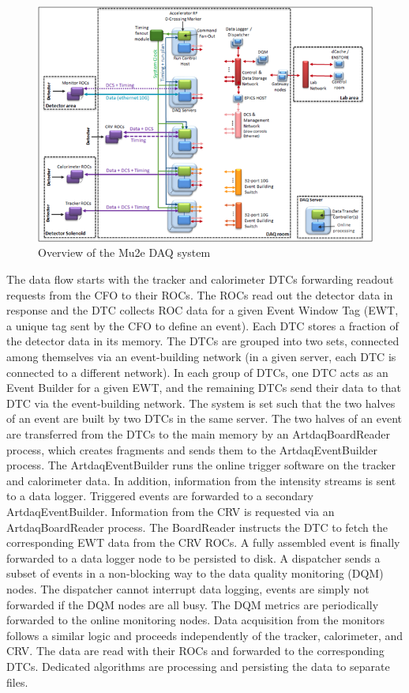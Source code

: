 \begin{figure}[htb]
\begin{center}
\includegraphics[width=0.9\linewidth]{figures/daq-overview.png}
\caption{Overview of the Mu2e DAQ system}
\label{fig:daqoverview}
\end{center}
\end{figure}

The data flow starts with the tracker and calorimeter DTCs forwarding readout requests from the CFO to their ROCs. The ROCs read out the detector data in response and the DTC collects ROC data for a given Event Window Tag (EWT, a unique tag sent by the CFO to define an event). Each DTC stores a fraction of the detector data in its memory. The DTCs are grouped into two sets, connected among themselves via an event-building network (in a given server, each DTC is connected to a different network). In each group of DTCs, one DTC acts as an Event Builder for a given EWT, and the remaining DTCs send their data to that DTC via the event-building network. The system is set such that the two halves of an event are built by two DTCs in the same server. The two halves of an event are transferred from the DTCs to the main memory by an ArtdaqBoardReader process, which creates fragments and sends them to the ArtdaqEventBuilder process. The ArtdaqEventBuilder runs the online trigger software on the tracker and calorimeter data. In addition, information from the intensity streams is sent to a data logger. Triggered events are forwarded to a secondary ArtdaqEventBuilder. Information from the CRV is requested via an ArtdaqBoardReader process. The BoardReader instructs the DTC to fetch the corresponding EWT data from the CRV ROCs. A fully assembled event is finally forwarded to a data logger node to be persisted to disk. A dispatcher sends a subset of events in a non-blocking way to the data quality monitoring (DQM) nodes. The dispatcher cannot interrupt data logging, events are simply not forwarded if the DQM nodes are all busy. The DQM metrics are periodically forwarded to the online monitoring nodes. Data acquisition from the monitors follows a similar logic and proceeds independently of the tracker, calorimeter, and CRV. The data are read with their ROCs and forwarded to the corresponding DTCs. Dedicated algorithms are processing and persisting the data to separate files. 

